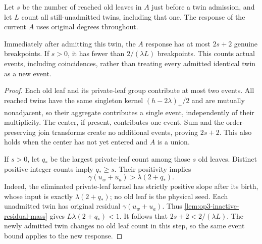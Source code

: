 Let $s$ be the number of reached old leaves in $A$ just before a twin
admission, and let $L$ count all still-unadmitted twins, including that one.
The response of the current $A$ uses original degrees throughout.

\begin{lemma}
\label{lem:op3-twin-event-budget}
Immediately after admitting this twin, the $A$ response has at most
$2s+2$ genuine breakpoints. If $s>0$, it has fewer than $2/(\lambda L)$
breakpoints. This counts actual events, including coincidences, rather
than treating every admitted identical twin as a new event.
\end{lemma}
\begin{proof}
Each old leaf and its private-leaf group contribute at most two events.
All reached twins have the same singleton kernel
$(h-2\lambda)_+/2$ and are mutually nonadjacent, so their aggregate
contributes a single event, independently of their multiplicity. The
center, if present, contributes one event. Sum and the order-preserving
join transforms create no additional events, proving $2s+2$.
This also holds when the center has not yet entered and $A$ is a union.

If $s>0$, let $q_*$ be the largest private-leaf count among those $s$
old leaves. Distinct positive integer counts imply $q_*\geq s$.
Their positivity implies
\[
 \gamma(u_w+u_a)>\lambda(2+q_*).
\]
Indeed, the eliminated private-leaf kernel has strictly positive slope
after its birth, whose input is exactly $\lambda(2+q_*)$; no old leaf
is the physical seed. Each unadmitted twin has original residual
$\gamma(u_w+u_a)$. Thus \cref{lem:op3-inactive-residual-mass} gives
$L\lambda(2+q_*)<1$. It follows that
$2s+2<2/(\lambda L)$. The newly admitted twin changes no old leaf count
in this step, so the same event bound applies to the new response.
\end{proof}

